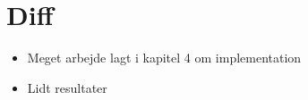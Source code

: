 {
\section*{Diff}
\begin{itemize}
    \item Meget arbejde lagt i kapitel 4 om implementation
    \item Lidt resultater
\end{itemize}
}

